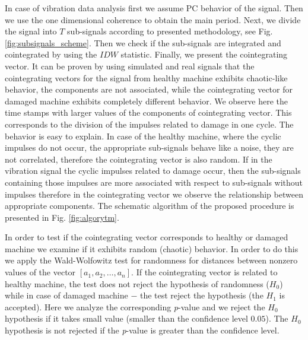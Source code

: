 \documentclass[preprint]{elsarticle}
\begin{document}
In case of vibration data analysis first we assume PC behavior of the signal. Then we use the one dimensional coherence to obtain the main period. Next, we divide the signal into $T$ sub-signals according to presented methodology, see Fig. \ref{fig:subsignals_scheme}. Then we check if the sub-signals  are integrated and cointegrated by using the $IDW$ statistic. Finally, we present the cointegrating vector. It can be proven by using simulated and real signals  that the cointegrating vectors for the signal from healthy machine exhibits chaotic-like behavior, the components are not associated, while the cointegrating vector for damaged machine exhibits completely different behavior. We observe here the time stamps with larger values of the components of cointegrating vector. This corresponds to the division of the impulses related to damage in one cycle. The behavior is easy to explain. In case of the healthy machine, where the cyclic impulses do not occur, the appropriate sub-signals behave like a noise, they are not correlated, therefore the cointegrating vector is also random. If in the vibration signal the cyclic impulses related to damage occur, then the sub-signals containing those impulses are more associated with respect to sub-signals without impulses therefore in the cointegrating vector we observe the relationship between appropriate components. The schematic algorithm of the proposed procedure is presented in Fig. \ref{fig:algorytm}.

In order to test if the cointegrating vector corresponds to healthy or damaged machine we examine if it exhibits random (chaotic) behavior. In order to do this we apply the Wald-Wolfowitz test for randomness \cite{wald1940test} for distances between nonzero values of the vector $[a_1,a_2,\dots, a_n]$. If the cointegrating vector is related to healthy machine, the test does not reject the hypothesis of randomness ($H_0$) while in case of damaged machine $-$ the test reject the hypothesis (the $H_1$ is accepted). Here we analyze the corresponding \emph{p}-value and we reject the $H_0$ hypothesis if it takes small value (smaller than the confidence level $0.05$). The $H_0$ hypothesis is not rejected if the \emph{p}-value is greater than the confidence level.
\end{document}
